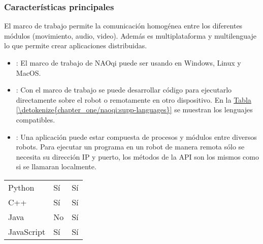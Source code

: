 \subsubsection{Características principales}
\label{\detokenize{chapter_one/naoqi:caracteristicas-principales}}
El marco de trabajo permite la comunicación homogénea entre los diferentes
módulos (movimiento, audio, video). Además es multiplataforma y multilenguaje
lo que permite crear aplicaciones distribuidas.
\begin{itemize}
\item {} 
 : El marco de trabajo de NAOqi puede ser usando en Windows, Linux y MacOS.

\item {} 
 : Con el marco de trabajo se puede desarrollar código para ejecutarlo directamente sobre el robot o remotamente en otro dispositivo. En la \hyperref[\detokenize{chapter_one/naoqi:supp-languages}]{Tabla \ref{\detokenize{chapter_one/naoqi:supp-languages}}} se muestran los lenguajes compatibles.

\item {} 
 : Una aplicación puede estar compuesta de procesos y módulos entre diversos robots. Para ejecutar un programa en un robot de manera remota sólo se necesita su dirección IP y puerto, los métodos de la API son los mismos como si se llamaran localmente.

\end{itemize}


\begin{savenotes}\sphinxattablestart
\centering
{}
\label{\detokenize{chapter_one/naoqi:supp-languages}}
\sphinxaftercaption
\begin{tabulary}{\linewidth}[t]{|T|T|T|}
\hline
{}\relax &\relax &\relax \\
\hline
Python
&
Sí
&
Sí
\\
\hline
C++
&
Sí
&
Sí
\\
\hline
Java
&
No
&
Sí
\\
\hline
JavaScript
&
Sí
&
Sí
\\
\hline
\end{tabulary}
\par
\sphinxattableend\end{savenotes}


